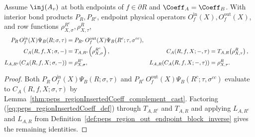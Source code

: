 \begin{lemma}
    \label{thm:peps_region_resonate_identity_readoffs}
    \leanok
    Assume $\inj(A_v)$ at both endpoints of $f\in\partial R$ and
    $\Coeff_A=\Coeff_B$. With interior bond products $P_R,P_{R^c}$, endpoint
    physical operators $O^{\mathrm{in}}_f(X),O^{\mathrm{out}}_f(X)$, and row
    functions $\rho^{R^c}_{X,\sigma},\rho^{R}_{X,\tau}$,
    \begin{align}
        P_R\,O^{\mathrm{in}}_f(X) \Psi_B(R;\sigma,\tau)
         & =
        P_{R^c}\,O^{\mathrm{out}}_f(X)
        \Psi_B(R^c;\tau,\sigma^{cc}),
        \notag \\
        C_A(R,f,X;\sigma,-)
         & =
        T_{A,R^c}\!\left(\rho^{R^c}_{X,\sigma}\right),
         &
        C_A(R,f,X;-,\tau)
         & =
        T_{A,R}\!\left(\rho^{R}_{X,\tau}\right),
        \notag \\
        L_{A,R^c}\!\left(C_A(R,f,X;\sigma,-)\right)
         & =
        \rho^{R^c}_{X,\sigma},
         &
        L_{A,R}\!\left(C_A(R,f,X;-,\tau)\right)
         & =
        \rho^{R}_{X,\tau}.
        \notag
    \end{align}
\end{lemma}
\begin{proof}\leanok
    Both $P_R\,O^{\mathrm{in}}_f(X)\Psi_B(R;\sigma,\tau)$ and
    $P_{R^c}\,O^{\mathrm{out}}_f(X)\Psi_B(R^c;\tau,\sigma^{cc})$ evaluate to
    $C_A(R,f,X;\sigma,\tau)$ by Lemma~\ref{thm:peps_regionInsertedCoeff_complement_cast}.
    Factoring (\ref{eq:peps_regionInsertedCoeff_def}) through $T_{A,R^c}$ and
    $T_{A,R}$ and applying $L_{A,R^c}$ and $L_{A,R}$ from
    Definition~\ref{def:peps_region_out_endpoint_block_inverse} gives the
    remaining identities.
\end{proof}
